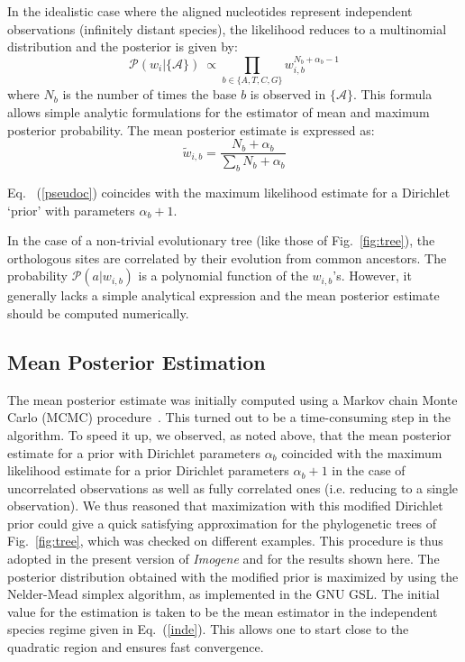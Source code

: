 \documentclass[a4,center,fleqn]{NAR}
\newcommand{\proba}{\mathcal{P}}
\begin{document}
In the idealistic case where the aligned nucleotides represent independent
observations (infinitely distant species), the likelihood reduces to
a multinomial distribution and the posterior is given by:
\begin{equation}
   \proba(w_{i}|\{\mathcal{A}\})\ \propto \prod_{b \in \{A,T,C,G\}} w_{i,b}^{N_b + \alpha_b-1}
   \label{inde}
\end{equation}
where $N_b$ is the number of times the base $b$ is observed in
$\{\mathcal{A}\}$. 
This formula allows simple analytic formulations for the estimator of mean and
maximum posterior probability.
The mean posterior estimate is expressed as:
\begin{equation}
\tilde{w}_{i,b} = \frac{N_b+\alpha_b}{\sum_b N_b+\alpha_b}
\label{pseudoc}
\end{equation}

Eq. ~(\ref{pseudoc}) coincides with the maximum likelihood estimate for
a Dirichlet `prior' with parameters $\alpha_b + 1$.

In the case of a non-trivial evolutionary tree (like those of
Fig.~\ref{fig:tree}), the orthologous sites  are correlated by their evolution
from common ancestors.
The probability $\proba(a|w_{i,b})$ is a polynomial function of the
$w_{i,b}$'s.
However, it generally lacks a simple analytical expression and the mean
posterior estimate should be computed numerically.    


\subsection*{Mean Posterior Estimation}
The mean posterior estimate was initially computed using a Markov chain Monte
Carlo (MCMC) procedure~\cite{bishop}.
This turned out to be a time-consuming step in the algorithm.
To speed it up, we observed, as noted above, that the mean posterior estimate
for a prior with Dirichlet parameters $\alpha_b $ coincided with the maximum
likelihood estimate for a prior Dirichlet parameters $\alpha_b +1$ in the case
of uncorrelated observations as well as fully correlated ones (i.e. reducing to
a single observation).
We thus reasoned that maximization with this modified
Dirichlet prior could give a quick satisfying approximation for the
phylogenetic trees of Fig.~\ref{fig:tree}, which was checked on different
examples.
This procedure is thus adopted in the present version of {\em Imogene} and for
the results shown here.
The  posterior distribution obtained with the modified prior  is maximized by
using the Nelder-Mead simplex algorithm, as implemented in the GNU GSL. 
The initial value for the estimation is taken to be the mean estimator in the
independent species regime given in Eq.~(\ref{inde}).
This allows one to start close to the quadratic region and ensures fast
convergence.
\end{document}
